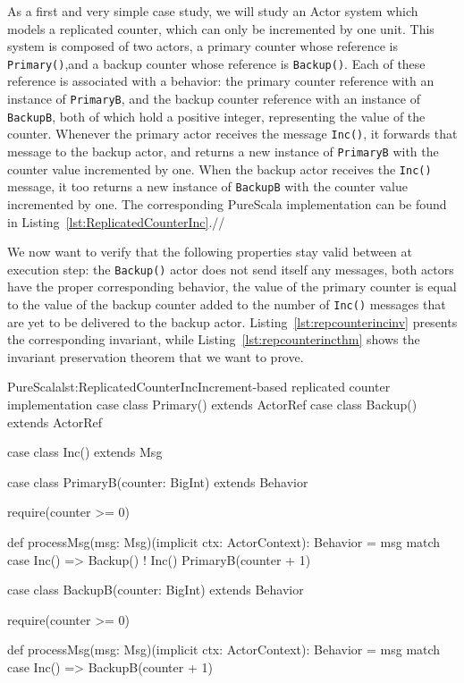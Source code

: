 \documentclass[a4paper,twoside]{article}
\newcommand{\RefCode}[1]{Listing~\ref{#1}}
\newcommand{\stt}[1]{\texttt{\small{#1}}}
\begin{document}
As a first and very simple case study, we will study an Actor system which models a replicated counter, which can only be incremented by one unit. This system is composed of two actors, a primary counter whose reference is \stt{Primary()},and a backup counter whose reference is \stt{Backup()}. Each of these reference is associated with a behavior: the primary counter reference with an instance of \stt{PrimaryB}, and the backup counter reference with an instance of \stt{BackupB}, both of which hold a positive integer, representing the value of the counter. Whenever the primary actor receives the message \stt{Inc()}, it forwards that message to the backup actor, and returns a new instance of \stt{PrimaryB} with the counter value incremented by one. When the backup actor receives the \stt{Inc()} message, it too returns a new instance of \stt{BackupB} with the counter value incremented by one. The corresponding PureScala implementation can be found in \RefCode{lst:ReplicatedCounterInc}.//

We now want to verify that the following properties stay valid between at execution step: the \stt{Backup()} actor does not send itself any messages, both actors have the proper corresponding behavior, the value of the primary counter is equal to the value of the backup counter added to the number of \stt{Inc()} messages that are yet to be delivered to the backup actor. \RefCode{lst:repcounterincinv} presents the corresponding invariant, while \RefCode{lst:repcounterincthm} shows the invariant preservation theorem that we want to prove.

\begin{Code}{PureScala}{lst:ReplicatedCounterInc}{Increment-based replicated counter implementation}
case class Primary() extends ActorRef
case class Backup()  extends ActorRef

case class Inc() extends Msg

case class PrimaryB(counter: BigInt) extends Behavior {
  require(counter >= 0)

  def processMsg(msg: Msg)(implicit ctx: ActorContext): Behavior = msg match {
    case Inc() =>
      Backup() ! Inc()
      PrimaryB(counter + 1)
  }
}

case class BackupB(counter: BigInt) extends Behavior {
  require(counter >= 0)

  def processMsg(msg: Msg)(implicit ctx: ActorContext): Behavior = msg match {
    case Inc() => BackupB(counter + 1)
  }
}
\end{Code}
\end{document}

